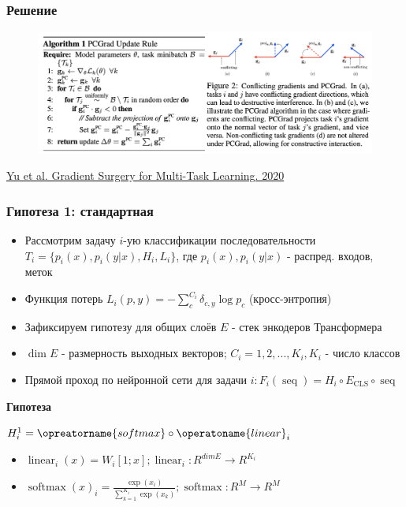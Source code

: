 \documentclass[aspectratio=169]{beamer}
\begin{document}
\begin{frame}
	\frametitle{Решение}
	\begin{figure}
	    \includegraphics[width=1\textwidth]{assets/grad_angle_solution.png}
	\end{figure}
	\href{https://arxiv.org/abs/2001.06782}{\color {blue} Yu et al. Gradient Surgery for Multi-Task Learning. 2020}
\end{frame}

\begin{frame}
	\frametitle{Гипотеза 1: стандартная}
	\begin{itemize}
		\item Рассмотрим задачу $i$-ую классификации последовательности $T_i = \{p_i(x), p_i(y | x), H_i, L_i\}$, где $p_i(x), p_i(y|x)$ - распред. входов, меток
		\item Функция потерь $L_i(p, y) = - \sum_{c}^{C_{i}} \delta_{c, y} \log p_c$ (кросс-энтропия)
		\item Зафиксируем гипотезу для общих слоёв $E$ - стек энкодеров Трансформера
		\item $\dim E$ - размерность выходных векторов; $C_i = {1, 2, ..., K_i}, K_i$ - число классов
		\item Прямой проход по нейронной сети для задачи $i: F_i(\operatorname{seq}) = H_i \circ E_{\operatorname{CLS}} \circ \operatorname{seq}$
	\end{itemize}

	\textbf{Гипотеза}

	$H_i^1 = \opreatorname{softmax} \circ \operatoname{linear}_i$

	\begin{itemize}
		\item $\operatorname{linear}_i(x) = W_i[1; x]; \operatorname{linear}_i : R ^ {dim E} \rightarrow R ^ {K_i}$
		\item $\operatorname{softmax}(x)_i = \frac{\exp(x_i)}{\sum_{k = 1}^{K_i} \exp(x_k)}; \operatorname{softmax} : R ^ {M} \rightarrow R ^ {M}$
	\end{itemize}
\end{frame}
\end{document}
